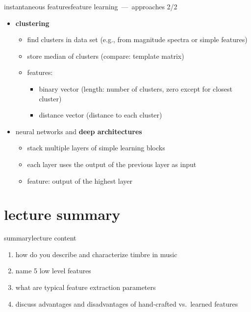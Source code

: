         \begin{frame}{instantaneous features}{feature learning~---~approaches 2/2}
            \begin{itemize}
                \item   \textbf{clustering} 
                    \begin{itemize}
                        \item   find clusters in data set (e.g., from magnitude spectra or simple features)
                        \item   store median of clusters (compare: template matrix)
                        \smallskip
                        \item<2->[$\rightarrow$]   features:
                            \begin{itemize}
                                \item   binary vector (length: number of clusters, zero except for closest cluster)
                                \item   distance vector (distance to each cluster)
                            \end{itemize}
                    \end{itemize}
                \bigskip
                \item<3->   neural networks and \textbf{deep architectures} 
                    \begin{itemize}
                        \item   stack multiple layers of simple learning blocks
                        \item   each layer uses the output of the previous layer as input
                        \smallskip
                        \item<4->[$\rightarrow$]   feature: output of the highest layer
                    \end{itemize}
            \end{itemize}
        \end{frame}

    \section[summary]{lecture summary}
        \begin{frame}{summary}{lecture content}
            \begin{enumerate}
                \item   how do you describe and characterize timbre in music
                \smallskip
                \item<2->   name 5 low level features
                \smallskip
                \item<3->   what are typical feature extraction parameters 
                \smallskip
                \item<4->   discuss advantages and disadvantages of hand-crafted vs.\ learned features
            \end{enumerate}
        \end{frame}


